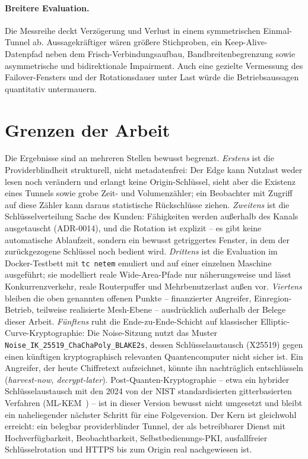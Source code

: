 \paragraph{Breitere Evaluation.} Die Messreihe deckt Verzögerung und Verlust in
einem symmetrischen Einmal-Tunnel ab. Aussagekräftiger wären größere
Stichproben, ein Keep-Alive-Datenpfad neben dem Frisch-Verbindungsaufbau,
Bandbreitenbegrenzung sowie asymmetrische und bidirektionale Impairment. Auch
eine gezielte Vermessung des Failover-Fensters und der Rotationsdauer unter Last
würde die Betriebsaussagen quantitativ untermauern.

\section{Grenzen der Arbeit}
\label{sec:grenzen}

Die Ergebnisse sind an mehreren Stellen bewusst begrenzt. \emph{Erstens} ist die
Providerblindheit strukturell, nicht metadatenfrei: Der Edge kann Nutzlast weder
lesen noch verändern und erlangt keine Origin-Schlüssel, sieht aber die Existenz
eines Tunnels sowie grobe Zeit- und Volumenzähler; ein Beobachter mit Zugriff auf
diese Zähler kann daraus statistische Rückschlüsse ziehen. \emph{Zweitens} ist
die Schlüsselverteilung Sache des Kunden: Fähigkeiten werden außerhalb des
Kanals ausgetauscht (ADR-0014), und die Rotation ist explizit -- es gibt keine
automatische Ablaufzeit, sondern ein bewusst getriggertes Fenster, in dem der
zurückgezogene Schlüssel noch bedient wird. \emph{Drittens} ist die Evaluation im
Docker-Testbett mit \texttt{tc~netem} emuliert und auf einer einzelnen Maschine
ausgeführt; sie modelliert reale Wide-Area-Pfade nur näherungsweise und lässt
Konkurrenzverkehr, reale Routerpuffer und Mehrbenutzerlast außen vor.
\emph{Viertens} bleiben die oben genannten offenen Punkte -- finanzierter
Angreifer, Einregion-Betrieb, teilweise realisierte Mesh-Ebene -- ausdrücklich
außerhalb der Belege dieser Arbeit. \emph{Fünftens} ruht die
Ende-zu-Ende-Schicht auf klassischer Elliptic-Curve-Kryptographie: Die
Noise-Sitzung nutzt das Muster \texttt{Noise\_IK\_25519\_ChaChaPoly\_BLAKE2s},
dessen Schlüsselaustausch (X25519) gegen einen künftigen kryptographisch
relevanten Quantencomputer nicht sicher ist. Ein Angreifer, der heute
Chiffretext aufzeichnet, könnte ihn nachträglich entschlüsseln
(\emph{harvest-now, decrypt-later}). Post-Quanten-Kryptographie -- etwa ein
hybrider Schlüsselaustausch mit den 2024 von der NIST standardisierten
gitterbasierten Verfahren (ML-KEM~\cite{nistfips203}) -- ist in dieser Version
bewusst nicht umgesetzt und bleibt ein naheliegender nächster Schritt für eine
Folgeversion. Der Kern ist gleichwohl erreicht: ein
belegbar providerblinder Tunnel, der als betreibbarer Dienst mit
Hochverfügbarkeit, Beobachtbarkeit, Selbstbedienungs-PKI, ausfallfreier
Schlüsselrotation und HTTPS bis zum Origin real nachgewiesen ist.
